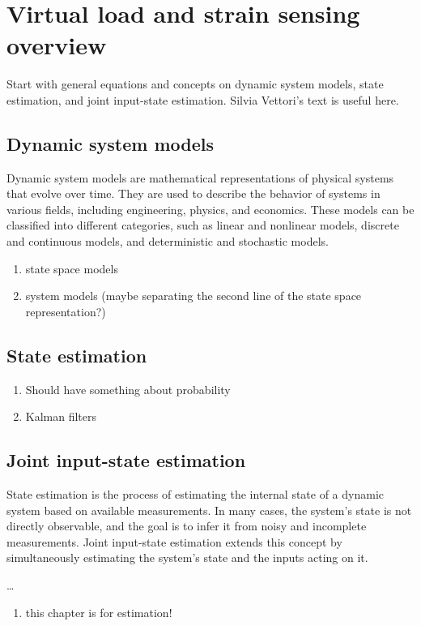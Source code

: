 \chapter{Virtual load and strain sensing overview}\label{ch:Virtual_load_and_strain_sensing_overview}

Start with general equations and concepts on dynamic system models, state estimation, and joint input-state estimation. Silvia Vettori's text is useful here.

\section{Dynamic system models}

Dynamic system models are mathematical representations of physical systems that evolve over time. They are used to describe the behavior of systems in various fields, including engineering, physics, and economics. These models can be classified into different categories, such as linear and nonlinear models, discrete and continuous models, and deterministic and stochastic models.

\begin{enumerate}
    \item state space models
    \item system models (maybe separating the second line of the state space representation?)
\end{enumerate}

\section{State estimation}

\begin{enumerate}
    \item Should have something about probability
    \item Kalman filters
\end{enumerate}

\section{Joint input-state estimation}

State estimation is the process of estimating the internal state of a dynamic system based on available measurements. In many cases, the system's state is not directly observable, and the goal is to infer it from noisy and incomplete measurements. Joint input-state estimation extends this concept by simultaneously estimating the system's state and the inputs acting on it.



\ldots

\begin{enumerate}
    \item this chapter is for estimation!
\end{enumerate}


\cleardoublepage

